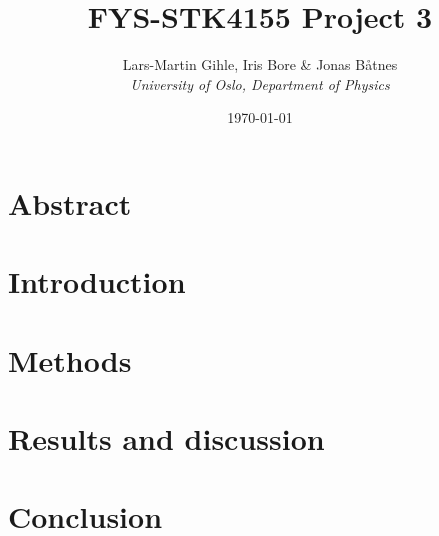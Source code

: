 \documentclass[12pt,a4paper,english,nofootinbib,sort&compress,numbers]{revtex4-2} %
\begin{document}
\title{FYS-STK4155 Project 3 \\ }       
\author{Lars-Martin Gihle, Iris Bore \& Jonas Båtnes   \\ \textit{University of Oslo, Department of Physics}}        %
\date{\today}                  %


\noaffiliation                 %

\begin{abstract}
    
\end{abstract}

\maketitle

\section{Abstract}
%
\label{sec:Abstract}


\newpage
\section{Introduction}
%
\label{sec:introduction}


\newpage
\section{Methods}\label{sec:methods}
%
\label{sec:methods}



\newpage
\section{Results and discussion}\label{sec:results_and_discussion}
%
\label{sec:results}


\newpage
\section{Conclusion}\label{sec:conclusion}
%
\label{sec:conclusion}

\end{document}
